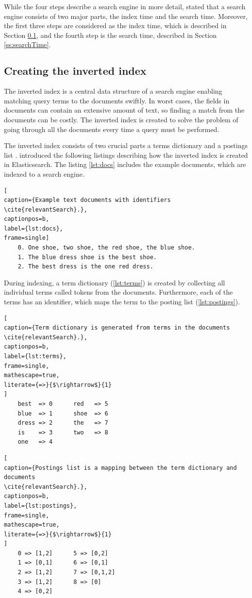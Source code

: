 While the four steps describe a search engine in more detail, 
\citeauthor{relevantSearch} \cite{relevantSearch} stated that 
a search engine consists of two major parts, the index time and the search time. 
Moreover, the first three steps are considered as the index time, which is described in Section \ref{ss:invertedIndex},
and the fourth step is the search time, described in Section \ref{ss:searchTime}.

\subsection{Creating the inverted index}
\label{ss:invertedIndex}

The inverted index is a central data structure of a search engine enabling 
matching query terms to the documents swiftly.
In worst cases, the fields in documents can contain an extensive amount of text, so 
finding a match from the documents can be costly.
The inverted index is created to solve the problem of going through all the documents 
every time a query must be performed. \cite{relevantSearch}


The inverted index consists of two crucial parts a terms dictionary and a postings list \cite{relevantSearch}.
\citeauthor{relevantSearch} \cite{relevantSearch} introduced the following listings
describing how the inverted index is created in Elasticsearch.
The listing \ref{lst:docs} includes the example documents, which are indexed to a search engine.
\begin{lstlisting}[
caption={Example text documents with identifiers \cite{relevantSearch}.},
captionpos=b,
label={lst:docs},
frame=single]
    0. One shoe, two shoe, the red shoe, the blue shoe.
    1. The blue dress shoe is the best shoe.
    2. The best dress is the one red dress.
\end{lstlisting}
During indexing, a term dictionary (\ref{lst:terms}) is created by collecting all individual
terms called tokens from the documents. 
Furthermore, each of the terms has an identifier, which maps the term to the posting list (\ref{lst:postings}).
\begin{lstlisting}[
caption={Term dictionary is generated from terms in the documents \cite{relevantSearch}.},
captionpos=b,
label={lst:terms},
frame=single,
mathescape=true,
literate={=>}{$\rightarrow$}{1}
]
    best  => 0      red   => 5
    blue  => 1      shoe  => 6
    dress => 2      the   => 7
    is    => 3      two   => 8
    one   => 4
\end{lstlisting}
\begin{lstlisting}[
caption={Postings list is a mapping between the term dictionary and documents
\cite{relevantSearch}.},
captionpos=b,
label={lst:postings},
frame=single,
mathescape=true,
literate={=>}{$\rightarrow$}{1}
]
    0 => [1,2]      5 => [0,2]
    1 => [0,1]      6 => [0,1]
    2 => [1,2]      7 => [0,1,2]
    3 => [1,2]      8 => [0]
    4 => [0,2]
\end{lstlisting}

